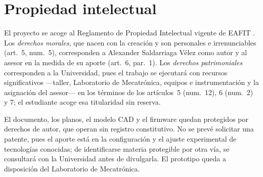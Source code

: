 \section{Propiedad intelectual}

El proyecto se acoge al Reglamento de Propiedad Intelectual vigente de EAFIT \cite{eafit_pi,eafit_pi_web}. Los \emph{derechos morales}, que nacen con la creación y son personales e irrenunciables (art.~5, num.~5), corresponden a Alexander Saldarriaga Vélez como autor y al asesor en la medida de su aporte (art.~6, par.~1). Los \emph{derechos patrimoniales} corresponden a la Universidad, pues el trabajo se ejecutará con recursos significativos —taller, Laboratorio de Mecatrónica, equipos e instrumentación y la asignación del asesor— en los términos de los artículos~5 (num.~12), 6 (num.~2) y 7; el estudiante acoge esa titularidad sin reserva.

El documento, los planos, el modelo CAD y el firmware quedan protegidos por derechos de autor, que operan sin registro constitutivo. No se prevé solicitar una patente, pues el aporte está en la configuración y el ajuste experimental de tecnologías conocidas; de identificarse materia protegible por otra vía, se consultará con la Universidad antes de divulgarla. El prototipo queda a disposición del Laboratorio de Mecatrónica.
